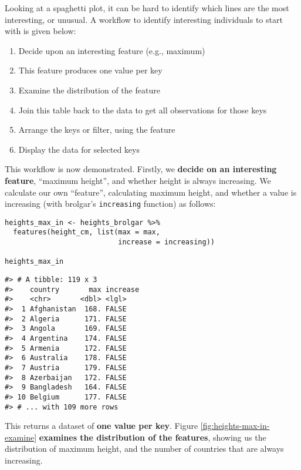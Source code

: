 Looking at a spaghetti plot, it can be hard to identify which lines are the most interesting, or unusual. A workflow to identify interesting individuals to start with is given below:

\begin{enumerate}
\def\labelenumi{\arabic{enumi}.}
\tightlist
\item
  Decide upon an interesting feature (e.g., maximum)
\item
  This feature produces one value per key
\item
  Examine the distribution of the feature
\item
  Join this table back to the data to get all observations for those keys
\item
  Arrange the keys or filter, using the feature
\item
  Display the data for selected keys
\end{enumerate}

This workflow is now demonstrated. Firstly, we \textbf{decide on an interesting feature}, ``maximum height'', and whether height is always increasing. We calculate our own ``feature'', calculating maximum height, and whether a value is increasing (with brolgar's \texttt{increasing} function) as follows:

\begin{verbatim}
heights_max_in <- heights_brolgar %>% 
  features(height_cm, list(max = max,
                           increase = increasing))

heights_max_in
\end{verbatim}

\begin{verbatim}
#> # A tibble: 119 x 3
#>    country       max increase
#>    <chr>       <dbl> <lgl>   
#>  1 Afghanistan  168. FALSE   
#>  2 Algeria      171. FALSE   
#>  3 Angola       169. FALSE   
#>  4 Argentina    174. FALSE   
#>  5 Armenia      172. FALSE   
#>  6 Australia    178. FALSE   
#>  7 Austria      179. FALSE   
#>  8 Azerbaijan   172. FALSE   
#>  9 Bangladesh   164. FALSE   
#> 10 Belgium      177. FALSE   
#> # ... with 109 more rows
\end{verbatim}

This returns a dataset of \textbf{one value per key}. Figure \ref{fig:heights-max-in-examine} \textbf{examines the distribution of the features}, showing us the distribution of maximum height, and the number of countries that are always increasing.

